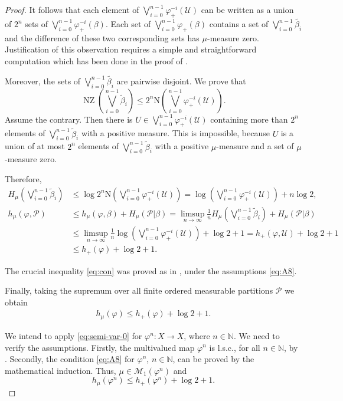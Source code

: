 \documentclass[12pt]{amsart}
\theoremstyle{definition}
\newcommand{\U}{\mathcal{U}}
\newcommand\N{\mathbb{N}}
\newcommand{\M}{{\mathcal{M}}}
\renewcommand{\P}{{\mathcal{P}}}
\newcommand{\NN}{{\mathrm{N}}}
\newcommand{\vp}{\varphi}
\newcommand{\NZ}{\operatorname{NZ}}
\begin{document}
\begin{proof}
It follows that each element of $\bigvee_{i=0}^{n-1}\vp^{-i}_{+}(\U)$ can be written as a union of $2^n$ sets of $\bigvee_{i=0}^{n-1}\vp_{+}^{-i}(\beta)$. Each set of $\bigvee_{i=0}^{n-1}\vp_{+}(\beta)$ contains a set of $\bigvee_{i=0}^{n-1} \tilde{\beta_i}$ and the difference of these two corresponding sets has $\mu$-measure zero. Justification of this observation requires a simple and straightforward computation which has been done in the proof of \cite[Proposition 1]{VS}. 

Moreover, the sets of $\bigvee_{i=0}^{n-1} \tilde{\beta_i}$ are pairwise disjoint. We prove that
\[
\NZ(\bigvee_{i=0}^{n-1}\tilde{\beta}_i)\leq 2^n \NN(\bigvee_{i=0}^{n-1}\vp^{-i}_{+}(\U)).
\]
Assume the contrary. Then there is $U\in\bigvee_{i=0}^{n-1}\vp^{-i}_{+}(\U)$ containing more than $2^n$ elements of $\bigvee_{i=0}^{n-1}\tilde{\beta}_i$ with a positive measure. This is impossible, because $U$ is a union of at most $2^n$ elements of $\bigvee_{i=0}^{n-1}\tilde{\beta}_i$ with a positive $\mu$-measure and a set of $\mu$-measure zero.

Therefore,
\begin{align}
H_{\mu}(\bigvee_{i=0}^{n-1}\tilde{\beta}_i)&\leq \log  2^n \NN(\bigvee_{i=0}^{n-1}\vp^{-i}_{+}(\U)) = \log(\bigvee_{i=0}^{n-1}\vp^{-i}_{+}(\U)) + n\log 2,\nonumber\\
h_{\mu}(\vp,\P)  &\leq h_{\mu}(\vp,\beta) + H_{\mu}(\P\vert\beta) = \limsup_{n\to\infty} \frac1{n}H_{\mu}(\bigvee_{i=0}^{n-1}\tilde{\beta}_i) + H_{\mu}(\P\vert\beta) \label{eq:con}\\
&\leq \limsup_{n\to\infty} \frac1{n} \log(\bigvee_{i=0}^{n-1}\vp^{-i}_{+}(\U)) +\log 2 + 1 = h_{+}(\vp,\U) + \log 2 + 1\nonumber\\
&\leq h_{+}(\vp) + \log 2 + 1 \nonumber.
\end{align}

The crucial inequality \eqref{eq:con} was proved as in \cite[condition (6)]{VS}, under the assumptions \eqref{eq:A8}.

Finally, taking the supremum over all finite ordered measurable partitions $\P$ we obtain
\begin{align}\label{eq:semi-var-0}
h_{\mu}(\vp) \leq h_{+}(\vp) + \log 2 + 1.
\end{align}

We intend to apply \eqref{eq:semi-var-0} for $\vp^n:X\multimap X$, where $n\in\N$. We need to verify the assumptions. Firstly, the multivalued map $\vp^n$ is l.s.c., for all $n\in\N$, by \cite[Proposition 1.2.56]{HP}. Secondly, the condition \eqref{eq:A8} for $\vp^n$, $n\in\N$, can be proved by the mathematical induction. Thus, $\mu\in\M_1(\vp^n)$ and
\[
h_{\mu}(\vp^n) \leq h_{+}(\vp^n) + \log 2 + 1.
\]


\end{proof}
\end{document}
